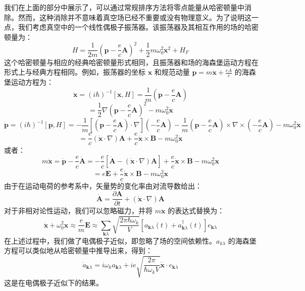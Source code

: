 我们在上面的部分中展示了，可以通过常规排序方法将零点能量从哈密顿量中消除。然而，这种消除并不意味着真空场已经不重要或没有物理意义。为了说明这一点，我们考虑真空中的一个线性偶极子振荡器。该振荡器及其相互作用的场的哈密顿量为：
\[
H = \frac{1}{2m} \left( \mathbf{p} - \frac{e}{c} \mathbf{A} \right)^2 + \frac{1}{2} m \omega_0^2 \mathbf{x}^2 + H_F~
\]
这个哈密顿量与相应的经典哈密顿量形式相同，且振荡器和场的海森堡运动方程在形式上与经典方程相同。例如，振荡器的坐标 \( \mathbf{x} \) 和规范动量 \( \mathbf{p} = m \dot{\mathbf{x}} + \frac{eA}{c} \) 的海森堡运动方程为：
\[
\dot{\mathbf{x}} = (i\hbar)^{-1} [\mathbf{x}, H] = \frac{1}{m} \left( \mathbf{p} - \frac{e}{c} \mathbf{A} \right)~
\]
\[
= \frac{1}{2} \nabla \left( \mathbf{p} - \frac{e}{c} \mathbf{A} \right)^2 - m \omega_0^2 \dot{\mathbf{x}}~
\]
\[
\dot{\mathbf{p}} = (i\hbar)^{-1} [\mathbf{p}, H] = -\frac{1}{m} \left[ \left( \mathbf{p} - \frac{e}{c} \mathbf{A} \right) \cdot \nabla \right] \left( -\frac{e}{c} \mathbf{A} \right) - \frac{1}{m} \left( \mathbf{p} - \frac{e}{c} \mathbf{A} \right) \times \nabla \times \left( -\frac{e}{c} \mathbf{A} \right) - m \omega_0^2 \dot{\mathbf{x}}~
\]
\[
= \frac{e}{c} (\dot{\mathbf{x}} \cdot \nabla) \mathbf{A} + \frac{e}{c} \dot{\mathbf{x}} \times \mathbf{B} - m \omega_0^2 \dot{\mathbf{x}}~
\]
或者：
\[
m \ddot{\mathbf{x}} = \dot{\mathbf{p}} - \frac{e}{c} \dot{\mathbf{A}} = -\frac{e}{c} \left[ \dot{\mathbf{A}} - (\dot{\mathbf{x}} \cdot \nabla) \mathbf{A} \right] + \frac{e}{c} \dot{\mathbf{x}} \times \mathbf{B} - m \omega_0^2 \mathbf{x}~
\]
\[
= e \mathbf{E} + \frac{e}{c} \dot{\mathbf{x}} \times \mathbf{B} - m \omega_0^2 \mathbf{x}~
\]
由于在运动电荷的参考系中，矢量势的变化率由对流导数给出：
\[
\dot{\mathbf{A}} = \frac{\partial \mathbf{A}}{\partial t} + (\dot{\mathbf{x}} \cdot \nabla) \mathbf{A}~
\]
对于非相对论性运动，我们可以忽略磁力，并将 \( m \ddot{\mathbf{x}} \) 的表达式替换为：
\[
\ddot{\mathbf{x}} + \omega_0^2 \mathbf{x} \approx \frac{e}{m} \mathbf{E} \approx \sum_{\mathbf{k} \lambda} \sqrt{\frac{2\pi \hbar \omega_k}{V}} \left[a_{\mathbf{k} \lambda}(t) + a_{\mathbf{k} \lambda}^{\dagger}(t)\right] e_{\mathbf{k} \lambda}~
\]
在上述过程中，我们做了电偶极子近似，即忽略了场的空间依赖性。\( a_{k\lambda} \) 的海森堡方程可以类似地从哈密顿量中推导出来，得到：
\[
\dot{a}_{\mathbf{k} \lambda} = i \omega_k a_{\mathbf{k} \lambda} + ie \sqrt{\frac{2\pi}{\hbar \omega_k V}} \dot{\mathbf{x}} \cdot e_{\mathbf{k} \lambda}~
\]
这是在电偶极子近似下的结果。

